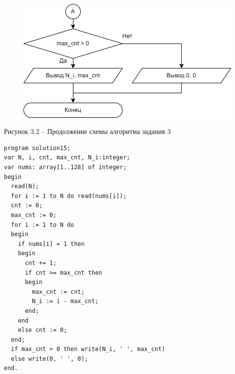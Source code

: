 \documentclass[a4paper,14pt]{extarticle}
\begin{document}
  \pagebreak
  \begin{figure}[h]
    \centering
    \includegraphics[width=0.55\linewidth]{schemes/s-3-2}
  \end{figure}
  \begin{center}
    Рисунок 3.2 – Продолжение схемы алгоритма задания 3
  \end{center}
  \begin{lstlisting}[tabsize=2,basicstyle=\ttfamily]
program solution15;
var N, i, cnt, max_cnt, N_i:integer;
var nums: array[1..128] of integer;
begin
  read(N);
  for i := 1 to N do read(nums[i]);
  cnt := 0;
  max_cnt := 0;
  for i := 1 to N do
  begin
    if nums[i] = 1 then
    begin
      cnt += 1;
      if cnt >= max_cnt then
      begin
        max_cnt := cnt;
        N_i := i - max_cnt;
      end;
    end
    else cnt := 0;
  end;
  if max_cnt > 0 then write(N_i, ' ', max_cnt)
  else write(0, ' ', 0);
end.
  \end{lstlisting}

  \newpage
\end{document}
